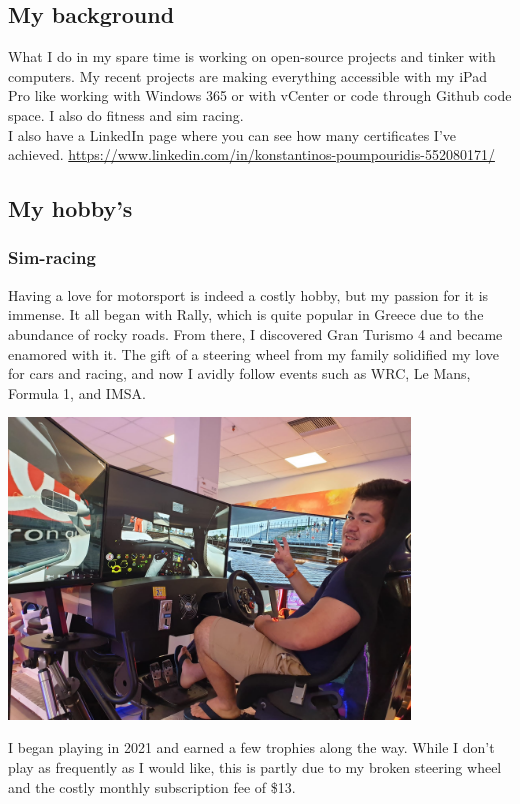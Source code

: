 \documentclass[12pt, letterpaper]{article}
\begin{document}
\subsection{My background}

What I do in my spare time is working on open-source projects and tinker with computers. My recent projects are making everything accessible with my iPad Pro like working with Windows 365 or with vCenter or code through Github code space. I also do fitness and sim racing.
\hfill\break
\\
I also have a LinkedIn page where you can see how many certificates I've achieved.
\hfill\break
\url{https://www.linkedin.com/in/konstantinos-poumpouridis-552080171/}
\\
\newpage
\subsection{My hobby's}

\subsubsection{Sim-racing}
Having a love for motorsport is indeed a costly hobby, but my passion for it is immense. It all began with Rally, which is quite popular in Greece due to the abundance of rocky roads. From there, I discovered Gran Turismo 4 and became enamored with it. The gift of a steering wheel from my family solidified my love for cars and racing, and now I avidly follow events such as WRC, Le Mans, Formula 1, and IMSA.
\begin{center}
    \includegraphics[width=0.8\textwidth]{fotos/simracingkosta.jpeg}
\end{center}
I began playing in 2021 and earned a few trophies along the way. While I don't play as frequently as I would like, this is partly due to my broken steering wheel and the costly monthly subscription fee of \$13.
\end{document}
